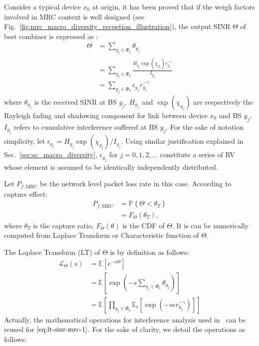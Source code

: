 Consider a typical device $x_0$ at origin, it has been proved that if the weigh factors involved in MRC context is well designed (see Fig.~\ref{fig:mrc_macro_diversity_recpetion_illustration}), the output $\text{SINR}$ $\Theta$ of best combiner is expressed as :
\begin{align}
\Theta &= \sum_{y_j \in \Phi_{b}}^{} \theta_{y_j} \nonumber\\
&= \sum_{y_j \in \Phi_{b}}^{} \frac{H_{y_j} \exp(\chi_{y_j}) r_{y_j}^{-\gamma}}{I_{y_j}} \nonumber\\
&= \sum_{y_j \in \Phi_{b}}^{} \epsilon_{y_j} r_{y_j}^{-\gamma}
\end{align}
where $\theta_{y_j}$ is the received SINR at BS $y_j$, $H_{y_{j}}$ and $\exp(\chi_{y_j})$ are respectively the Rayleigh fading and shadowing component for link between device $x_0$ and BS $y_j$, $I_{y_j}$ refers to cumulative interference suffered at BS $y_j$. For the sake of notation simplicity, let $\epsilon_{y_j}  = H_{y_j}\exp(\chi_{y_j})  / I_{y_j}$. Using similar justification explained in Sec.~\ref{sec:sc_macro_diversity}, $\epsilon_{y_j}$ for $j=0,1,2,...$ constitute a series of RV whose element is assumed to be identically independently distributed. 

Let $P_{f, \text{MRC}}$ be the network level packet loss rate in this case. According to capture effect:
\begin{align}
	P_{f, \text{MRC}} &= \mathbb{P} \left\lbrace \Theta < \theta_{T} \right\rbrace \nonumber \\
	&= F_{\Theta} (\theta_{T}),
\end{align}
where $\theta_{T}$ is the capture ratio, $F_{\Theta} (\theta)$ is the CDF of $\Theta$. It is can be numerically computed from Laplace Transform or Characteristic function of $\Theta$.

The Laplace Transform (LT) of $\Theta$ is by definition as follows:
\begin{align}
\label{eq:lt-sinr-mrc-1}
\mathcal{L}_{\Theta}\left( s \right) &= \mathbb{E}\left[ e^{-s\Theta}\right] \nonumber\\
&=\mathbb{E}\left[ \exp( -s \sum_{y_j \in \Phi_{b}}^{} \theta_{y_j} )\right] \nonumber\\
&= \mathbb{E}\left[ \prod_{y_j \in \Phi_b}^{} \mathbb{E}_{\epsilon} \left[ \exp( -s \epsilon r_{y_{j}}^{-\gamma}) \right] \right] 
\end{align}
Actually, the mathematical operations for interference analysis used in~\cite{haenggi2009interference} can be reused for $\eqref{eq:lt-sinr-mrc-1}$. For the sake of clarity, we detail the operations as follows:
 
